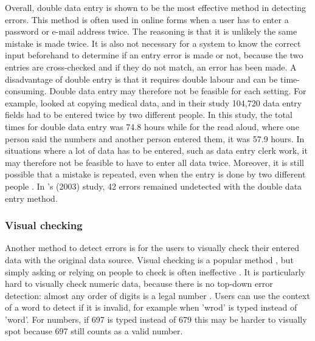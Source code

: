 Overall, double data entry is shown to be the most effective method in detecting errors. This method is often used in online forms when a user has to enter a password or e-mail address twice. The reasoning is that it is unlikely the same mistake is made twice. It is also not necessary for a system to know the correct input beforehand to determine if an entry error is made or not, because the two entries are cross-checked and if they do not match, an error has been made. 
 A disadvantage of double entry is that it requires double labour and can be time-consuming. Double data entry may therefore not be feasible for each setting. 
For example, \citet{Kawado2003} looked at copying medical data, and in their study 104,720 data entry fields had to be entered twice by two different people. In this study, the total times for double data entry was 74.8 hours while for the read aloud, where one person said the numbers and another person entered them, it was 57.9 hours. In situations where a lot of data has to be entered, such as data entry clerk work, it may therefore not be feasible to have to enter all data twice.  Moreover, it is still possible that a mistake is repeated, even when the entry is done by two different people \citep{Nakata2014}. In \citeauthor{Kawado2003}'s (2003) study, 42 errors remained undetected with the double data entry method.

\subsubsection{Visual checking}
Another method to detect errors is for the users to visually check their entered data with the original data source. Visual checking is a popular method \citep{Tu2014}, but simply asking or relying on people to check is often ineffective \citep{Barchard2011, Nakata2014, Norman2002, Olsen2008}. It is particularly hard to visually check numeric data, because there is no top-down error detection: almost any order of digits is a legal number \citep{Lin2014, Nakata2014}. Users can use the context of a word to detect if it is invalid, for example when 'wrod' is typed instead of 'word'. For numbers, if 697 is typed instead of 679 this may be harder to visually spot because 697 still counts as a valid number. 

